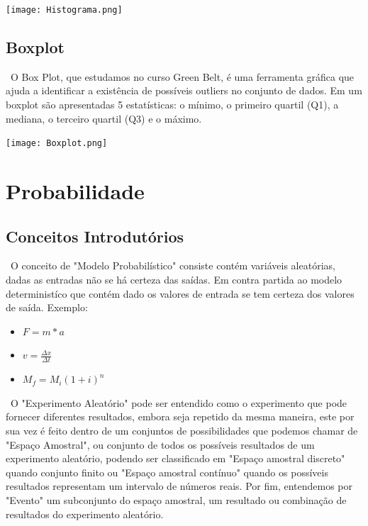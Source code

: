 \documentclass{article}
\begin{document}
\begin{multicols}{2}
        \hbox{\texttt{[image: Histograma.png]}}

        \subsection{Boxplot}  
        \ O Box Plot, que estudamos no curso Green Belt, é uma ferramenta gráfica que ajuda a identificar a existência de 
        possíveis outliers no conjunto de dados. Em um boxplot são apresentadas 5 estatísticas: o mínimo, o primeiro quartil 
        (Q1), a mediana, o terceiro quartil (Q3) e o máximo.

        \hbox{\texttt{[image: Boxplot.png]}}  

    \end{multicols}

    \newpage
    
\section{Probabilidade}
    
    \subsection{Conceitos Introdutórios}

        \ O conceito de "Modelo Probabilístico" consiste contém variáveis aleatórias, 
        dadas as entradas não se há certeza das saídas. Em contra partida ao modelo deterministíco 
        que contém dado os valores de entrada se tem certeza dos valores de saída. Exemplo:
        \begin{itemize}
            \item $ F = m*a $
            \item $ v = \frac{\Delta x}{\Delta t} $
            \item $ M_f = M_i (1 + i)^n $ 
        \end{itemize}
    
    
        \ O "Experimento Aleatório" pode ser entendido como o experimento que pode fornecer diferentes resultados,
        embora seja repetido da mesma maneira, este por sua vez é feito dentro de um conjuntos de possibilidades
        que podemos chamar de "Espaço Amostral", ou conjunto de todos os possíveis resultados de um experimento
        aleatório, podendo ser classificado em "Espaço amostral discreto" quando conjunto finito ou "Espaço amostral 
        contínuo" quando os possíveis resultados representam um intervalo de números reais. Por fim,
        entendemos por "Evento" um subconjunto do espaço amostral, um resultado ou combinação de
        resultados do experimento aleatório.
\end{document}
